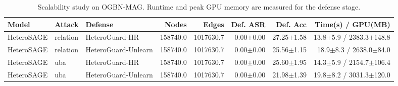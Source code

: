 \begin{table}[t]
\centering
\caption{Scalability study on OGBN-MAG. Runtime and peak GPU memory are measured for the defense stage.}
\label{tab:scalability_ogbn_mag}
\begin{tabular}{lllrrrrr}
\toprule
Model & Attack & Defense & Nodes & Edges & Def. ASR & Def. Acc & Time(s) / GPU(MB) \\
\midrule
HeteroSAGE & relation & HeteroGuard-HR & 158740.0 & 1017630.7 & 0.00$\pm$0.00 & 27.25$\pm$1.58 & 13.8$\pm$5.9 / 2383.3$\pm$148.8 \\
HeteroSAGE & relation & HeteroGuard-Unlearn & 158740.0 & 1017630.7 & 0.00$\pm$0.00 & 25.56$\pm$1.15 & 18.9$\pm$8.3 / 2638.0$\pm$84.0 \\
HeteroSAGE & uba & HeteroGuard-HR & 158740.0 & 1017630.7 & 0.00$\pm$0.00 & 25.60$\pm$1.95 & 14.3$\pm$5.9 / 2154.7$\pm$106.4 \\
HeteroSAGE & uba & HeteroGuard-Unlearn & 158740.0 & 1017630.7 & 0.00$\pm$0.00 & 21.98$\pm$1.39 & 19.8$\pm$8.2 / 3031.3$\pm$120.0 \\
\bottomrule
\end{tabular}
\end{table}
